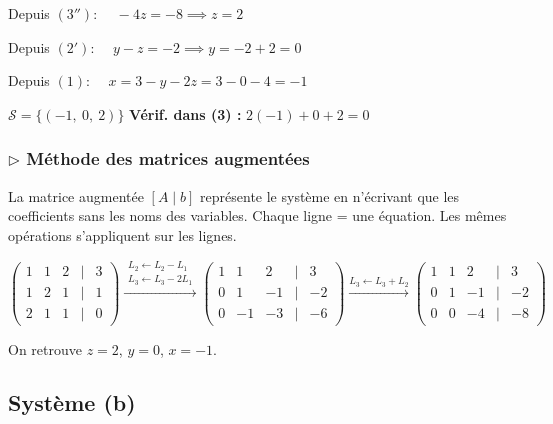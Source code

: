 \documentclass[12pt,a4paper]{article}
\begin{document}
Depuis $(3'')$: $\quad -4z = -8 \implies \boxed{z=2}$

Depuis $(2')$: $\quad y - z = -2 \implies y = -2 + 2 = \boxed{0}$

Depuis $(1)$: $\quad x = 3 - y - 2z = 3 - 0 - 4 = \boxed{-1}$

\begin{solbox}
$\mathcal{S} = \{(-1,\ 0,\ 2)\}$ \hfill \textbf{Vérif. dans (3) :} $2(-1) + 0 + 2 = 0$ \checkmark
\end{solbox}

\subsubsection*{$\triangleright$ Méthode des matrices augmentées}

\begin{methode}
La matrice augmentée $[A \mid b]$ représente le système en n'écrivant que les coefficients sans les noms des variables. Chaque ligne = une équation. Les mêmes opérations s'appliquent sur les lignes.
\end{methode}

\[
\begin{pmatrix}
1 & 1 & 2 & \mid & 3 \\
1 & 2 & 1 & \mid & 1 \\
2 & 1 & 1 & \mid & 0
\end{pmatrix}
\xrightarrow{\substack{L_2 \leftarrow L_2 - L_1 \\ L_3 \leftarrow L_3 - 2L_1}}
\begin{pmatrix}
1 & 1 & 2 & \mid & 3 \\
0 & 1 & -1 & \mid & -2 \\
0 & -1 & -3 & \mid & -6
\end{pmatrix}
\xrightarrow{L_3 \leftarrow L_3 + L_2}
\begin{pmatrix}
1 & 1 & 2 & \mid & 3 \\
0 & 1 & -1 & \mid & -2 \\
0 & 0 & -4 & \mid & -8
\end{pmatrix}
\]

On retrouve $z=2$, $y=0$, $x=-1$.

\subsection{Système (b)}
\end{document}
